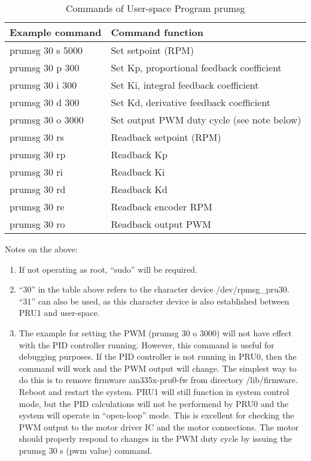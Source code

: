 \begin{longtable}{ll}
\caption{Commands of User-space Program prumsg}\\
\toprule
Example command & Command function \\\midrule
prumsg 30 s 5000 & Set setpoint (RPM) \\ 
prumsg 30 p 300 & Set Kp, proportional feedback coefficient \\ 
prumsg 30 i 300 & Set Ki, integral feedback coefficient \\ 
prumsg 30 d 300 & Set Kd, derivative feedback coefficient \\ 
prumsg 30 o 3000 & Set output PWM duty cycle (see note below) \\ 
prumsg 30 rs & Readback setpoint (RPM) \\ 
prumsg 30 rp & Readback Kp \\ 
prumsg 30 ri & Readback Ki \\ 
prumsg 30 rd & Readback Kd \\ 
prumsg 30 re & Readback encoder RPM \\
prumsg 30 ro & Readback output PWM
\end{longtable}

Notes on the above:
\begin{enumerate}
\item If not operating as root, ``sudo'' will be required.
 
\item ``30'' in the table above refers to the character device /dev/rpmsg\_pru30.  ``31'' can also be used, as this character device is also established between PRU1 and user-space.
 
\item The example for setting the PWM (prumsg 30 o 3000) will not have effect with the PID controller running.  However, this command is useful for debugging purposes.  If the PID controller is not running in PRU0, then the command will work and the PWM output will change.  The simplest way to do this is to remove firmware am335x-pru0-fw from directory /lib/firmware.  Reboot and restart the system.  PRU1 will still function in system control mode, but the PID calculations will not be performend by PRU0 and the system will operate in ``open-loop'' mode.  This is excellent for checking the PWM output to the motor driver IC and the motor connections.  The motor should properly respond to changes in the PWM duty cycle by issuing the prumsg 30 s (pwm value) command.
\end{enumerate}
